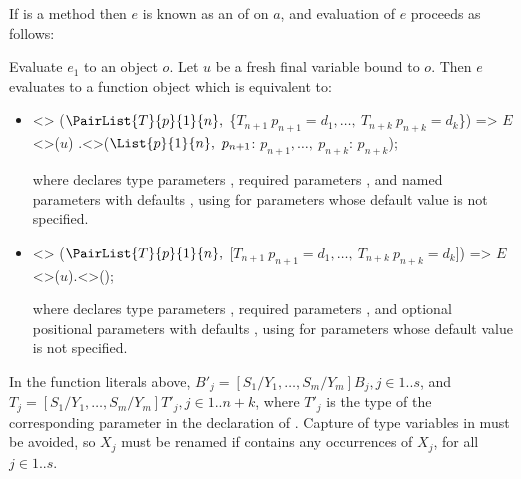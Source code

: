 \documentclass[makeidx]{article}
\begin{document}

\LMHash{}%
If \id{} is a method then $e$ is known as an
of \id{} on $a$,
and evaluation of $e$
proceeds as follows:

\LMHash{}%
Evaluate $e_1$ to an object $o$.
Let $u$ be a fresh final variable bound to $o$.
Then $e$ evaluates to a function object which is equivalent to:

\begin{itemize}
\item
\begin{normativeDartCode}
<>
($\PairList{T}{p}{1}{n},\ $\{$T_{n+1}\ p_{n+1} = d_1, \ldots,\ T_{n+k}\ p_{n+k} = d_k$\}) =>
\quad$E$<>($u$)
\quad.\id<>($\List{p}{1}{n},\ p_{n+1}$: $p_{n+1}, \ldots,\ p_{n+k}$: $p_{n+k}$);
\end{normativeDartCode}
where \id{} declares type parameters
\TypeParametersStd,
required parameters ,
and named parameters  with defaults ,
using  for parameters whose default value is not specified.
\item
\begin{normativeDartCode}
<>
($\PairList{T}{p}{1}{n},\ $[$T_{n+1}\ p_{n+1} = d_1, \ldots,\ T_{n+k}\ p_{n+k} = d_k$]) =>
\quad$E$<>($u$).\id<>();
\end{normativeDartCode}
where \id{} declares type parameters
\TypeParametersStd,
required parameters ,
and optional positional parameters
 with defaults ,
using  for parameters whose default value is not specified.
\end{itemize}

\LMHash{}%
In the function literals above,
$B'_j = [S_1/Y_1, \ldots, S_m/Y_m]B_j, j \in 1 .. s$,
and $T_j = [S_1/Y_1, \ldots, S_m/Y_m]T'_j, j \in 1 .. n+k$,
where $T'_j$ is the type of the corresponding parameter in
the declaration of \id.
Capture of type variables in  must be avoided,
so $X_j$ must be renamed if  contains any occurrences of $X_j$,
for all $j \in 1 .. s$.

\end{document}
